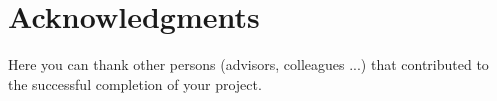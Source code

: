 \documentclass[fleqn,moreauthors,10pt]{ds_report}
\begin{document}



\section*{Acknowledgments}

Here you can thank other persons (advisors, colleagues ...) that contributed to the successful completion of your project.




\end{document}
